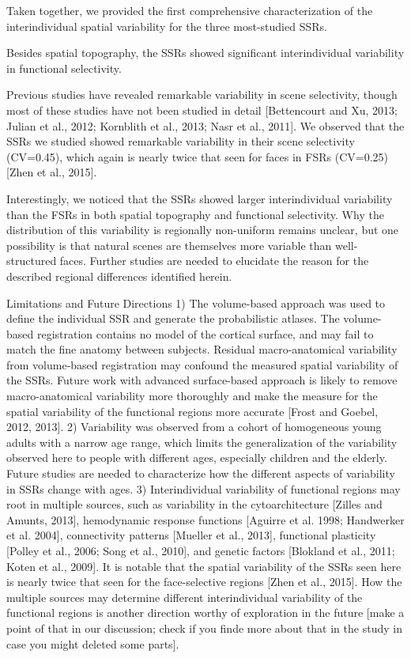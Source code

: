 %
Taken together, we provided the first comprehensive characterization of the
interindividual spatial variability for the three most-studied SSRs.

%
Besides spatial topography, the SSRs showed significant interindividual
variability in functional selectivity.

%
Previous studies have revealed remarkable variability in scene selectivity,
though most of these studies have not been studied in detail [Bettencourt and
Xu, 2013; Julian et al., 2012; Kornblith et al., 2013; Nasr et al., 2011].
%
We observed that the SSRs we studied showed remarkable variability in their
scene selectivity (CV=0.45), which again is nearly twice that seen for faces
in FSRs (CV=0.25) [Zhen et al., 2015].

%
Interestingly, we noticed that the SSRs showed larger interindividual
variability than the FSRs in both spatial topography and functional selectivity.
%
Why the distribution of this variability is regionally non-uniform remains
unclear, but one possibility is that natural scenes are themselves more variable
than well-structured faces.
%
Further studies are needed to elucidate the reason for the described regional
differences identified herein.

Limitations and Future Directions
%
1) The volume-based approach was used to define the individual SSR and generate
the probabilistic atlases.
%
The volume-based registration contains no model of the cortical surface, and may
fail to match the fine anatomy between subjects.
%
Residual macro-anatomical variability from volume-based registration may
confound the measured spatial variability of the SSRs.
%
Future work with advanced surface-based approach is likely to remove
macro-anatomical variability more thoroughly and make the measure for the
spatial variability of the functional regions more accurate [Frost and Goebel,
2012, 2013].
%
2) Variability was observed from a cohort of homogeneous young adults with a
narrow age range, which limits the generalization of the variability observed
here to people with different ages, especially children and the elderly.
%
Future studies are needed to characterize how the different aspects of
variability in SSRs change with ages.
%
3) Interindividual variability of functional regions may root in
multiple sources, such as variability in the cytoarchitecture [Zilles and
Amunts, 2013], hemodynamic response functions [Aguirre et al. 1998; Handwerker
et al. 2004], connectivity patterns [Mueller et al., 2013], functional
plasticity [Polley et al., 2006; Song et al., 2010], and genetic factors
[Blokland et al., 2011; Koten et al., 2009].
%
It is notable that the spatial variability of the SSRs seen here is nearly twice
that seen for the face-selective regions [Zhen et al., 2015]. How the multiple
sources may determine different interindividual variability of the functional
regions is another direction worthy of exploration in the future [make a point
of that in our discussion; check if you finde more about that in the study in
case you might deleted some parts].


